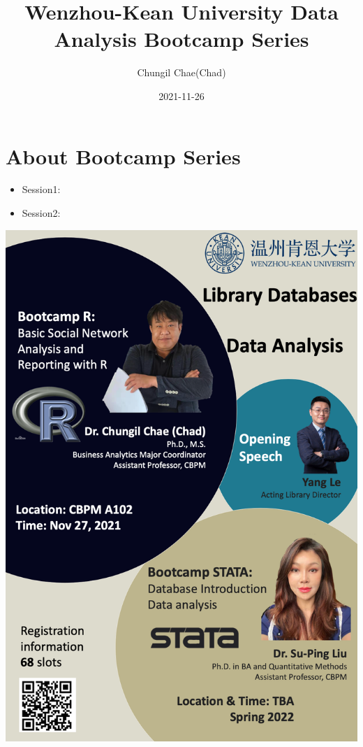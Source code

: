 \documentclass[
]{book}
\title{Wenzhou-Kean University Data Analysis Bootcamp Series}
\author{Chungil Chae(Chad)}
\date{2021-11-26}
\providecommand{\tightlist}{%
  \setlength{\itemsep}{0pt}\setlength{\parskip}{0pt}}
\begin{document}
\maketitle

{
\setcounter{tocdepth}{1}
\tableofcontents
}
\hypertarget{about-bootcamp-series}{%
\chapter{About Bootcamp Series}\label{about-bootcamp-series}}

\begin{itemize}
\tightlist
\item
  Session1:
\item
  Session2:
\end{itemize}

\includegraphics[width=6.25in,height=\textheight]{images/0.png}
\end{document}
